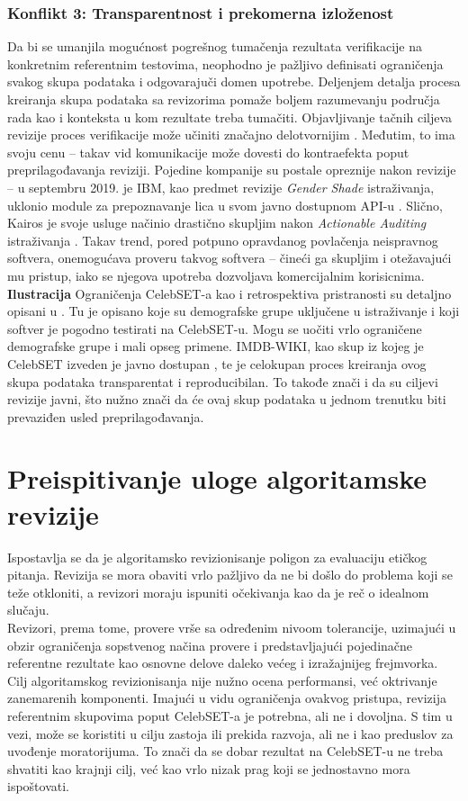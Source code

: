 \documentclass[11pt, a4paper]{article}
\begin{document}
\subsubsection{Konflikt 3: Transparentnost i prekomerna izloženost}
Da bi se umanjila mogućnost pogrešnog tumačenja rezultata verifikacije na konkretnim referentnim testovima, neophodno je pažljivo definisati ograničenja svakog skupa podataka i odgovarajuči domen upotrebe. Deljenjem detalja procesa kreiranja skupa podataka sa revizorima pomaže boljem razumevanju područja rada kao i konteksta u kom rezultate treba tumačiti. Objavljivanje tačnih ciljeva revizije proces verifikacije može učiniti značajno delotvornijim \cite{G39}. Međutim, to ima svoju cenu -- takav vid komunikacije može dovesti do kontraefekta poput preprilagođavanja reviziji. Pojedine kompanije su postale opreznije nakon revizije -- u septembru 2019. je IBM, kao predmet revizije \textit{Gender Shade} istraživanja, uklonio module za prepoznavanje lica u svom javno dostupnom API-u \cite{G26}. Slično, Kairos je svoje usluge načinio drastično skupljim nakon \textit{Actionable Auditing} istraživanja \cite{G27}. Takav trend, pored potpuno opravdanog povlačenja neispravnog softvera, onemogućava proveru takvog softvera -- čineći ga skupljim i otežavajući mu pristup, iako se njegova upotreba dozvoljava komercijalnim korisicnima. \\
\indent \textbf{Ilustracija} Ograničenja CelebSET-a kao i retrospektiva pristranosti su detaljno opisani u \cite{G20}. Tu je opisano koje su demografske grupe uključene u istraživanje i koji softver je pogodno testirati na CelebSET-u. Mogu se uočiti vrlo ograničene demografske grupe i mali opseg primene. IMDB-WIKI, kao skup iz kojeg je CelebSET izveden je javno dostupan \cite{G40}, te je celokupan proces kreiranja ovog skupa podataka transparentat i reproducibilan. To takođe znači i da su ciljevi revizije javni, što nužno znači da će ovaj skup podataka u jednom trenutku biti prevaziđen usled preprilagođavanja.

\section{Preispitivanje uloge algoritamske revizije}
Ispostavlja se da je algoritamsko revizionisanje poligon za evaluaciju etičkog pitanja. Revizija se mora obaviti vrlo pažljivo da ne bi došlo do problema koji se teže otkloniti, a revizori moraju ispuniti očekivanja kao da je reč o idealnom slučaju. \\
\indent Revizori, prema tome, provere vrše sa određenim nivoom tolerancije, uzimajući u obzir ograničenja sopstvenog načina provere i predstavljajući pojedinačne referentne rezultate kao osnovne delove daleko većeg i izražajnijeg frejmvorka. Cilj algoritamskog revizionisanja nije nužno ocena performansi, već oktrivanje zanemarenih komponenti. Imajući u vidu ograničenja ovakvog pristupa, revizija referentnim skupovima poput CelebSET-a je potrebna, ali ne i dovoljna. S tim u vezi, može se koristiti u cilju zastoja ili prekida razvoja, ali ne i kao preduslov za uvođenje moratorijuma. To znači da se dobar rezultat na CelebSET-u ne treba shvatiti kao krajnji cilj, već kao vrlo nizak prag koji se jednostavno mora ispoštovati.
\end{document}
